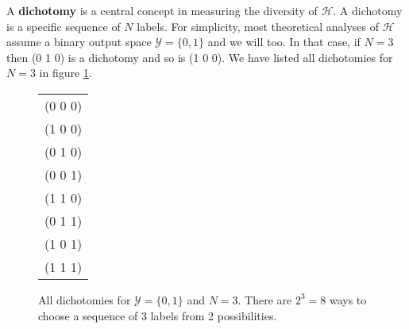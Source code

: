 A \textbf{dichotomy} is a central concept in measuring the diversity of $\mathcal{H}$. A dichotomy is a specific sequence of $N$ labels. For simplicity, most theoretical analyses of $\mathcal{H}$ assume a binary output space $\mathcal{Y} = \{0, 1\}$ and we will too. In that case, if $N = 3$ then (0 1 0) is a dichotomy and so is (1 0 0). We have listed all dichotomies for $N = 3$ in figure \ref{dichotomies}.

\begin{figure}[h]
	\begin{center}
			\begin{tabular}{c}
		(0 0 0) \\
		(1 0 0) \\
		(0 1 0) \\
		(0 0 1) \\
		(1 1 0) \\
		(0 1 1) \\
		(1 0 1) \\
		(1 1 1) \\
	\end{tabular}
	\end{center}
	\caption{All dichotomies for $\mathcal{Y} = \{0, 1\}$ and $N = 3$. There are $2^3 = 8$ ways to choose a sequence of 3 labels from 2 possibilities.}
	\label{dichotomies}
\end{figure}


